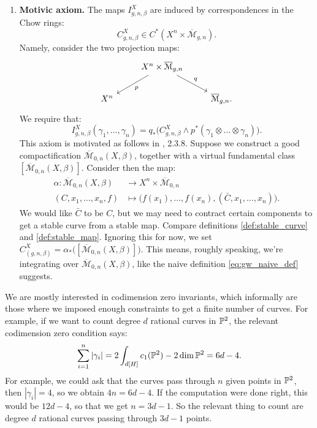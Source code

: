 \begin{defin}[2.2 in \cite{km_gw}]
\begin{enumerate}
\item \textbf{Motivic axiom.} The maps $I^X_{g,n,\beta}$ are induced by correspondences in the Chow rings:
\[	C^X_{g,n,\beta} \in C^*(X^n \times \overline{\mathcal{M}}_{g,n}).	\]
Namely, consider the two projection maps:
\[
\begin{tikzcd}
\; & X^n \times \overline{\mathcal{M}}_{g,n}\arrow{dl}{p}\arrow{dr}{q} & \\ X^n & & \overline{\mathcal{M}}_{g,n}.
\end{tikzcd}
\]
We require that:
\[	I^X_{g,n,\beta}(\gamma_1, \dots, \gamma_n) = q_*\big(C^X_{g,n,\beta} \wedge p^* (\gamma_1\otimes \dots \otimes \gamma_n)\big).\]
This axiom is motivated as follows in \cite{km_gw}, 2.3.8.
Suppose we construct a good compactification $\overline{\mathcal{M}}_{0,n}(X,\beta)$,
together with a virtual fundamental class $[\overline{\mathcal{M}}_{0,n}(X,\beta)]$. Consider then the map:
\begin{align*}
\alpha :\overline{\mathcal{M}}_{0,n}(X,\beta) &\to X^n \times \overline{\mathcal{M}}_{0,n} \\
(C, x_1, \dots, x_n, f) &\mapsto \big(f(x_1), \dots, f(x_n), (\bar C, x_1, \dots, x_n)\big).
\end{align*}
We would like $\bar C$ to be $C$, but we may need to contract certain components to get a stable curve from a stable map.
Compare definitions \ref{def:stable_curve} and \ref{def:stable_map}. 
Ignoring this for now, we set $C^X_(g,n,\beta) = \alpha_*\big( [\overline{\mathcal{M}}_{0,n}(X,\beta)]\big)$. This
means, roughly speaking, we're integrating over $\overline{\mathcal{M}}_{0,n}(X,\beta)$, like the naive definition
\ref{eq:gw_naive_def} suggests.
\end{enumerate}
\end{defin}

We are mostly interested in codimension zero invariants, which informally are those where we imposed enough constraints
to get a finite number of curves. For example, if we want to count degree $d$ rational curves in $\mathbb P^2$,
the relevant codimension zero condition says:
\[	\sum_{i=1}^n |\gamma_i| = 2 \int_{d[H]} c_1(\mathbb P^2) - 2 \dim \mathbb P^2 = 6d - 4.	\]
For example, we could ask that the curves pass through $n$ given points in $\mathbb P^2$, then $|\gamma_i| = 4$, so we obtain
$4n = 6d-4$. If the computation were done right, this would be $12d-4$, so that we get $n=3d-1$. So the relevant thing
to count are degree $d$ rational curves passing through $3d-1$ points.








